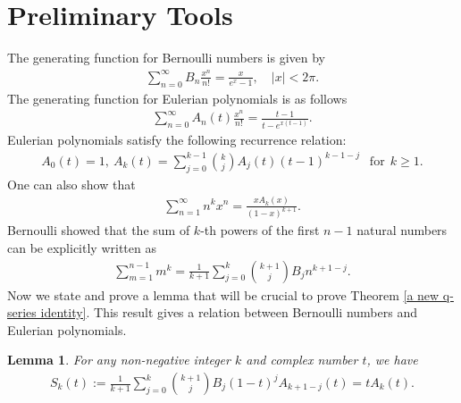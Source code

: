 \documentclass[11pt,reqno]{amsart}
\renewcommand{\(}{\left\(}
\renewcommand{\)}{\right\)}
\renewcommand{\[}{\left\[}
\renewcommand{\]}{\right\]}
\numberwithin{equation}{section}
\theoremstyle{plain}
\newtheorem{lemma}[theorem]{Lemma}
\begin{document}
\section{Preliminary Tools}\label{Preliminary}
The generating function for Bernoulli numbers is given by 
\begin{align*}
\sum_{n=0}^\infty B_n \frac{x^n}{n!} = \frac{x}{e^x-1},  \quad |x| < 2\pi.  
\end{align*}
The generating function for Eulerian polynomials \cite[p.~244]{comtet}  is as follows
\begin{align*}
\sum_{n=0}^\infty A_n(t) \frac{x^n}{n!} = \frac{t-1}{t-e^{x(t-1)}}.
\end{align*}
Eulerian polynomials satisfy the following recurrence relation:
\begin{align}\label{recurrence relation of Eulerian polynomial}
A_0(t)=1,  ~ A_k(t)=\sum_{j=0}^{k-1} {k \choose j} A_j(t)(t-1)^{k-1-j} ~~\textrm{ for}~~ k \geq 1.
\end{align}
One can also show that
\begin{align}\label{eulerian polynomial}
\sum_{n=1}^\infty n^k x^n = \frac{xA_k(x)}{(1-x)^{k+1}}.
\end{align}
Bernoulli showed that the sum of $k$-th powers of the first $n-1$ natural numbers can be explicitly written as    
\begin{align}\label{sum of k-th power} 
\sum_{m=1}^{n-1} m^k=\frac{1}{k+1}\sum_{j=0}^k {k+1 \choose j} B_j n^{k+1-j}.
\end{align}
Now we state and prove a lemma that will be crucial to prove Theorem \ref{a new q-series identity}.  This result gives a relation between Bernoulli numbers and Eulerian polynomials.  
\begin{lemma}\label{relation between B_n and A_n(t)}
For any non-negative integer $k$ and complex number $t$, we have
\begin{align*}
S_k(t):=\frac{1}{k+1}\sum_{j=0}^k {k+1 \choose j} B_j(1-t)^j A_{k+1-j}(t)=tA_k(t).
\end{align*}
\end{lemma}
\end{document}
